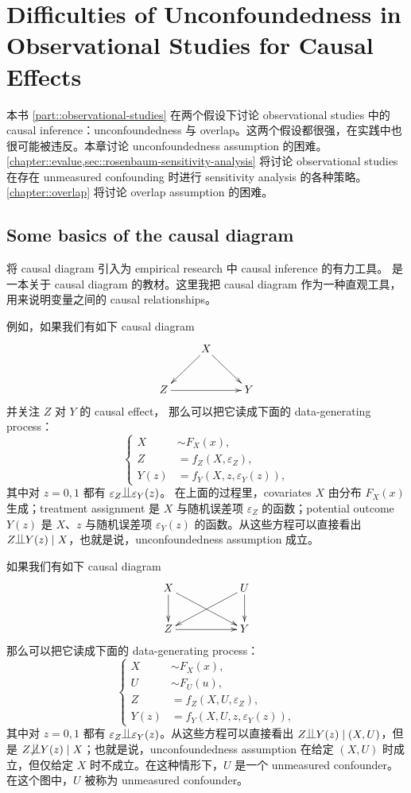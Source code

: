 
\chapter{Difficulties of Unconfoundedness in Observational Studies for Causal Effects}
 \label{chapter::difficulties-observational-studies}
 
 
本书 \cref{part::observational-studies} 在两个假设下讨论 observational studies 中的 causal inference：unconfoundedness 与 overlap。这两个假设都很强，在实践中也很可能被违反。本章讨论 unconfoundedness assumption 的困难。\cref{chapter::evalue,sec::rosenbaum-sensitivity-analysis} 将讨论 observational studies 在存在 unmeasured confounding 时进行 sensitivity analysis 的各种策略。\cref{chapter::overlap} 将讨论 overlap assumption 的困难。
 
 
 

\section{Some basics of the causal diagram}


\citet{pearl1995causal} 将 causal diagram 引入为 empirical research 中 causal inference 的有力工具。
\citet{pearl2000causality} 是一本关于 causal diagram 的教材。这里我把 causal diagram 作为一种直观工具，用来说明变量之间的 causal relationships。

例如，如果我们有如下 causal diagram
$$
\xymatrix{
 & X \ar[ld]\ar[rd] \\
Z\ar[rr] &&Y 
}
$$
并关注 $Z$ 对 $Y$ 的 causal effect，
那么可以把它读成下面的 data-generating process：
$$
\left\{ 
\begin{aligned}
      X & \sim F_X(x), \\
      Z  &=   f_Z(X, \varepsilon_Z) , \\
      Y(z) &=  f_Y(X, z, \varepsilon_Y(z)) ,
\end{aligned}
\right. 
$$
其中对 $z=0,1$ 都有 $\varepsilon_Z \ind \varepsilon_Y(z)$。
在上面的过程里，covariates $X$ 由分布 $F_X(x)$ 生成；treatment assignment 是 $X$ 与随机误差项 $\varepsilon_Z$ 的函数；potential outcome $ Y(z) $ 是 $X$、$z$ 与随机误差项 $\varepsilon_Y(z)$ 的函数。从这些方程可以直接看出 $Z\ind Y(z) \mid X$，也就是说，unconfoundedness assumption 成立。


如果我们有如下 causal diagram
$$
\xymatrix{
 X \ar[d]\ar[rrd] & & U\ar[d]\ar[lld] \\
Z\ar[rr] &&Y 
}
$$
那么可以把它读成下面的 data-generating process：
$$
\left\{ 
\begin{aligned}
       X & \sim F_X(x), \\
       U& \sim F_U(u), \\ 
      Z  &=   f_Z(X, U,  \varepsilon_Z) , \\
      Y(z) &=  f_Y(X, U, z, \varepsilon_Y(z)) ,
\end{aligned}
\right. 
$$
其中对 $z=0,1$ 都有 $\varepsilon_Z \ind \varepsilon_Y(z)$。从这些方程可以直接看出 $Z\ind Y(z) \mid (X,U)$，但是 $Z\nind Y(z) \mid X$；也就是说，unconfoundedness assumption 在给定 $(X,U)$ 时成立，但仅给定 $X$ 时不成立。在这种情形下，$U$ 是一个 unmeasured confounder。在这个图中，$U$ 被称为 unmeasured confounder。







